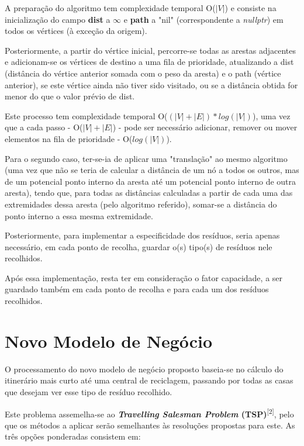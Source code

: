 \documentclass[article, a4paper, 12pt, oneside]{memoir}
\begin{document}
A preparação do algoritmo tem complexidade temporal O($|V|$) e consiste na inicialização do campo \textbf{dist} a $\infty$ e \textbf{path} a "nil" (correspondente a \textit{nullptr}) em todos os vértices (à exceção da origem).

Posteriormente, a partir do vértice inicial, percorre-se todas as arestas adjacentes e adicionam-se os vértices de destino a uma fila de prioridade, atualizando a dist (distância do vértice anterior somada com o peso da aresta) e o path (vértice anterior), se este vértice ainda não tiver sido visitado, ou se a distância obtida for menor do que o valor prévio de dist.

Este processo tem complexidade temporal O($(|V| + |E|)*log(|V|)$), uma vez que a cada passo - O($|V| + |E|$) - pode ser necessário adicionar, remover ou mover elementos na fila de prioridade - O($log(|V|)$).
	
Para o segundo caso, ter-se-ia de aplicar uma "translação" ao mesmo algoritmo (uma vez que não se teria de calcular a distância de um nó a todos os outros, mas de um potencial ponto interno da aresta até um potencial ponto interno de outra aresta), tendo que, para todas as distâncias calculadas a partir de cada uma das extremidades dessa aresta (pelo algoritmo referido), somar-se a distância do ponto interno a essa mesma extremidade.

Posteriormente, para implementar a especificidade dos resíduos, seria apenas necessário, em cada ponto de recolha, guardar o(s) tipo(s) de resíduos nele recolhidos.

Após essa implementação, resta ter em consideração o fator capacidade, a ser guardado também em cada ponto de recolha e para cada um dos resíduos recolhidos.

\section{Novo Modelo de Negócio}

O processamento do novo modelo de negócio proposto baseia-se no cálculo do itinerário mais curto até uma central de reciclagem, passando por todas as casas que desejam ver esse tipo de resíduo recolhido.

Este problema assemelha-se ao \textbf{\textit{Travelling Salesman Problem} (TSP)}\textsuperscript{[2]}, pelo que os métodos a aplicar serão semelhantes às resoluções propostas para este. As três opções ponderadas consistem em:
\end{document}
